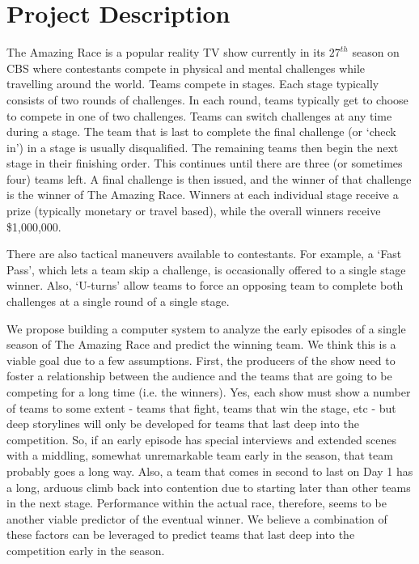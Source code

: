 \documentclass[10pt, twoside]{article}
\begin{document}
\section{Project Description}
The Amazing Race is a popular reality TV show currently in its $27^{th}$ season on
CBS where contestants compete in physical and mental challenges while travelling
around the world. Teams compete in stages. Each stage typically consists of two
rounds of challenges. In each round, teams typically get to choose to compete in
one of two challenges. Teams can switch challenges at any time during a stage.
The team that is last to complete the final challenge (or ‘check in’) in a stage
is usually disqualified. The remaining teams then begin the next stage in their
finishing order. This continues until there are three (or sometimes four) teams
left. A final challenge is then issued, and the winner of that challenge is the
winner of The Amazing Race. Winners at each individual stage receive a prize
(typically monetary or travel based), while the overall winners receive \$1,000,000.

There are also tactical maneuvers available to contestants. For example, a `Fast
Pass’, which lets a team skip a challenge, is occasionally offered to a single stage
winner. Also, `U-turns’ allow teams to force an opposing team to complete both
challenges at a single round of a single stage.

We propose building a computer system to analyze the early episodes of a
single season of The Amazing Race and predict the winning team. We think this
is a viable goal due to a few assumptions. First, the producers of the show need
to foster a relationship between the audience and the teams that are going to be
competing for a long time (i.e. the winners). Yes, each show must show a number
of teams to some extent - teams that fight, teams that win the stage, etc - but deep
storylines will only be developed for teams that last deep into the competition.
So, if an early episode has special interviews and extended scenes with a middling,
somewhat unremarkable team early in the season, that team probably goes a long
way. Also, a team that comes in second to last on Day 1 has a long, arduous
climb back into contention due to starting later than other teams in the next
stage. Performance within the actual race, therefore, seems to be another viable
predictor of the eventual winner. We believe a combination of these factors can be
leveraged to predict teams that last deep into the competition early in the season.
\end{document}
